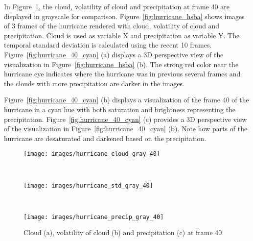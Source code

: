 In Figure~\ref{fig:hurricane_gray}, the cloud, volatility of cloud and precipitation at frame 40 are displayed in grayscale for comparison.
Figure~\ref{fig:hurricane_hsba} shows images of 3 frames of the hurricane rendered with cloud, volatility of cloud and precipitation. Cloud is used as variable X and precipitation as variable Y. The temporal standard deviation is calculated using the recent 10 frames.
Figure~\ref{fig:hurricane_40_cyan} (a) displays a 3D perspective view of the visualization in Figure~\ref{fig:hurricane_hsba} (b).
The strong red color near the hurricane eye indicates where the hurricane was in previous several frames and the clouds with more precipitation are darker in the images.

Figure~\ref{fig:hurricane_40_cyan} (b) displays a visualization of the frame 40 of the hurricane in a cyan hue with both saturation and brightness representing the precipitation. Figure~\ref{fig:hurricane_40_cyan} (c) provides a 3D perspective view of the visualization in Figure~\ref{fig:hurricane_40_cyan} (b). Note how parts of the hurricane are desaturated and darkened based on the precipitation.

\begin{figure}
\centering
\begin{minipage}{.33\textwidth}
\texttt{[image: images/hurricane\_cloud\_gray\_40]}
\subcaption{}
\end{minipage}~
\begin{minipage}{.33\textwidth}
\texttt{[image: images/hurricane\_std\_gray\_40]}
\subcaption{}
\end{minipage}~
\begin{minipage}{.33\textwidth}
\texttt{[image: images/hurricane\_precip\_gray\_40]}
\subcaption{}
\end{minipage}
\caption{Cloud (a), volatility of cloud (b) and precipitation (c) at frame 40}
\label{fig:hurricane_gray}
\end{figure}

